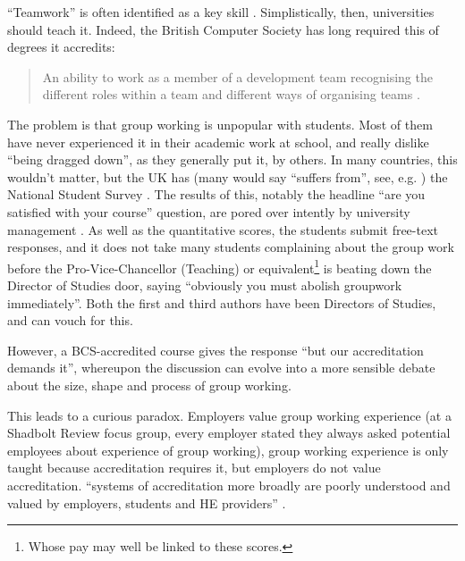 \documentclass[sigconf]{acmart}
\begin{document}
``Teamwork'' is often identified as a key skill \cite[and many
others]{ArcherDavidson2008}. Simplistically, then, universities should
teach it. Indeed, the British Computer Society has long required this
of degrees it accredits:
\begin{quote} An ability to work as a member of a development team
recognising the different roles within a team and different ways of
organising teams \cite[Requirement 2.3.1]{BCS2018a}.
\end{quote}
The problem is that group working is unpopular with students. Most of them have never experienced it in their academic work at school, and really dislike ``being dragged down'', as they generally put it, by others. In many countries, this wouldn't matter, but the UK has (many would say ``suffers from'', see, e.g. \cite{Cupples2015a}) the National Student Survey \cite{OfS2018a}. The results of this, notably the headline ``are you satisfied with your course'' question, are pored over intently by university management \cite[Myth 3]{OfS2018a}. As well as the quantitative scores, the students submit free-text responses, and it does not take many students complaining about the group work before the Pro-Vice-Chancellor (Teaching) or equivalent\footnote{Whose pay may well be linked to these scores.} is beating down the Director of Studies door, saying ``obviously you must abolish groupwork immediately''. Both the first and third authors have been Directors of Studies, and can vouch for this.

However, a BCS-accredited course gives the response ``but our accreditation demands it'', whereupon the discussion can evolve into a more sensible debate about the size, shape and process of group working.
\par
This leads to a curious paradox. Employers value group working experience (at a Shadbolt Review focus group, every employer stated they always asked potential employees about experience of group working), group working experience is only taught because accreditation requires it, but employers do not value accreditation.  ``systems of accreditation more broadly are poorly understood and valued by employers, students and HE providers'' \cite[\P2.12]{Shadbolt2016a}.
\end{document}
